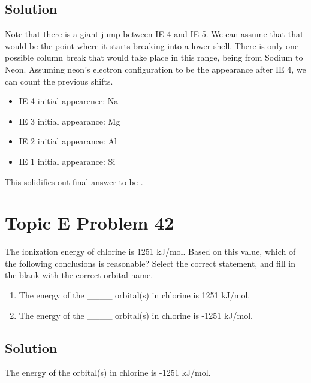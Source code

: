 \documentclass[10pt]{article}
\begin{document}
        \subsection{Solution}
            Note that there is a giant jump between IE 4 and IE 5.
            We can assume that that would be the point where it starts breaking into a lower shell.
            There is only one possible column break that would take place in this range, being from Sodium to Neon.
            Assuming neon's electron configuration to be the appearance after IE 4, we can count the previous shifts.
            \begin{itemize}
                \item   IE 4 initial appearence: Na
                \item   IE 3 initial appearance: Mg
                \item   IE 2 initial appearance: Al
                \item   IE 1 initial appearance: Si
            \end{itemize}

            This solidifies out final answer to be .

    \section{Topic E Problem 42}
        The ionization energy of chlorine is 1251 kJ/mol. 
        Based on this value, which of the following conclusions is reasonable? 
        Select the correct statement, and fill in the blank with the correct orbital name.
        \begin{enumerate}[label=\alph*)]
            \item   The energy of the \_\_\_\_ orbital(s) in chlorine is 1251 kJ/mol.
            \item   The energy of the \_\_\_\_ orbital(s) in chlorine is -1251 kJ/mol.
        \end{enumerate}

        \subsection{Solution}
            The energy of the  orbital(s) in chlorine is -1251 kJ/mol.

    \pagebreak

    \tableofcontents
\end{document}
